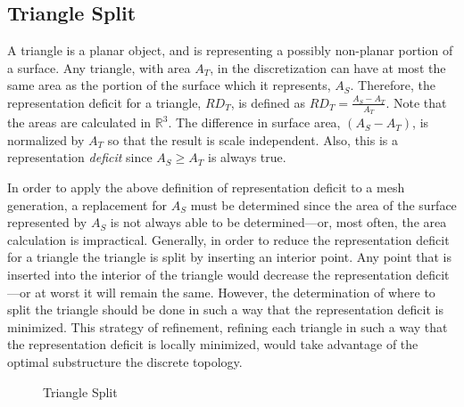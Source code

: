 \subsection{Triangle Split}
A triangle is a planar object, and is representing a possibly non-planar
portion of a surface. Any triangle, with area $A_T$, in the
discretization can have at most the same area as the portion of the
surface which it represents, $A_S$. Therefore, the representation
deficit for a triangle, $RD_T$, is defined as $RD_T = \frac{A_S -
A_T}{A_T}$. Note that the areas are calculated in ${\mathbb R}^3$. The
difference in surface area, $\left(A_S - A_T\right)$, is normalized by
$A_T$ so that the result is scale independent. Also, this is a
representation {\it deficit} since $A_S \ge A_T$ is always true.

In order to apply the above definition of representation deficit to a
mesh generation, a replacement for $A_S$ must be determined since the
area of the surface represented by $A_S$ is not always able to be
determined---or, most often, the area calculation is impractical.
Generally, in order to reduce the representation deficit for a triangle
the triangle is split by inserting an interior point. Any point that is
inserted into the interior of the triangle would decrease the
representation deficit---or at worst it will remain the same. However,
the determination of where to split the triangle should be done in such
a way that the representation deficit is minimized. This strategy of
refinement, refining each triangle in such a way that the representation
deficit is locally minimized, would take advantage of the optimal
substructure the discrete topology.

\begin{figure}[h!]
  \caption{Triangle Split}
\end{figure}


